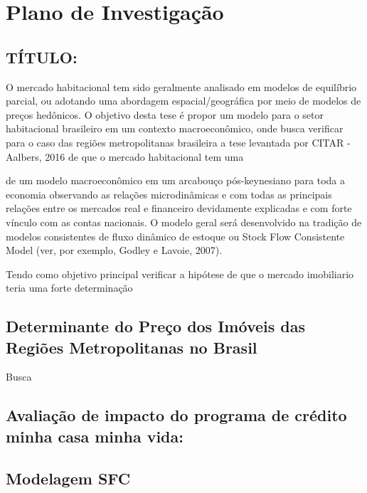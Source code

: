 \section{Plano de Investigação}

\subsection{TÍTULO:}

O mercado habitacional tem sido geralmente analisado em modelos de equilíbrio parcial, ou adotando uma abordagem espacial/geográfica por meio de modelos de preços hedônicos. O objetivo desta tese é propor um modelo para o setor habitacional brasileiro em um contexto macroeconômico, onde busca verificar para o caso das regiões metropolitanas brasileira a tese levantada por CITAR - Aalbers, 2016 de que o mercado habitacional tem uma 

de um modelo macroeconômico em um arcabouço pós-keynesiano para toda a economia observando as relações microdinâmicas e com todas as principais relações entre os mercados real e financeiro devidamente explicadas e com forte vínculo com as contas nacionais. O modelo geral será desenvolvido na tradição de modelos consistentes de fluxo dinâmico de estoque ou Stock Flow Consistente Model (ver, por exemplo, Godley e Lavoie, 2007).

Tendo como objetivo principal verificar a hipótese de que o mercado imobiliario teria uma forte determinação 

\subsection{Determinante do Preço dos Imóveis das Regiões Metropolitanas no Brasil}

Busca 

\subsection{Avaliação de impacto do programa de crédito minha casa minha vida: }

\subsection{Modelagem SFC}